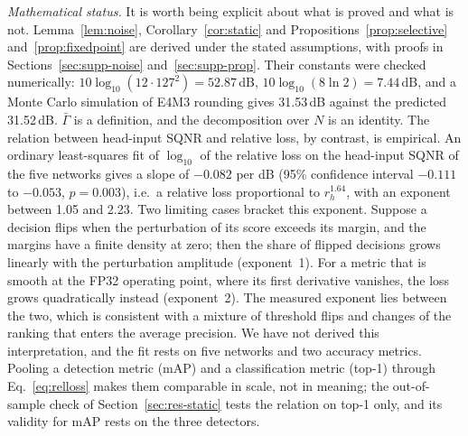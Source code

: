 \documentclass[pdflatex,sn-mathphys-num]{sn-jnl}%
\theoremstyle{thmstyleone}%
\theoremstyle{thmstyletwo}%
\theoremstyle{thmstylethree}%
\begin{document}
\emph{Mathematical status.} It is worth being explicit about what is proved and what is not. Lemma~\ref{lem:noise}, Corollary~\ref{cor:static} and Propositions~\ref{prop:selective} and~\ref{prop:fixedpoint} are derived under the stated assumptions, with proofs in Sections~\ref{sec:supp-noise} and~\ref{sec:supp-prop}. Their constants were checked numerically: $10\log_{10}(12\cdot127^2)=52.87$\,dB, $10\log_{10}(8\ln2)=7.44$\,dB, and a Monte Carlo simulation of E4M3 rounding gives 31.53\,dB against the predicted 31.52\,dB. $\bar\Gamma$ is a definition, and the decomposition over $N$ is an identity. The relation between head-input SQNR and relative loss, by contrast, is empirical. An ordinary least-squares fit of $\log_{10}$ of the relative loss on the head-input SQNR of the five networks gives a slope of $-0.082$ per dB (95\% confidence interval $-0.111$ to $-0.053$, $p=0.003$), i.e.\ a relative loss proportional to $r_h^{1.64}$, with an exponent between 1.05 and 2.23. Two limiting cases bracket this exponent. Suppose a decision flips when the perturbation of its score exceeds its margin, and the margins have a finite density at zero; then the share of flipped decisions grows linearly with the perturbation amplitude (exponent~1). For a metric that is smooth at the FP32 operating point, where its first derivative vanishes, the loss grows quadratically instead (exponent~2). The measured exponent lies between the two, which is consistent with a mixture of threshold flips and changes of the ranking that enters the average precision. We have not derived this interpretation, and the fit rests on five networks and two accuracy metrics. Pooling a detection metric (mAP) and a classification metric (top-1) through Eq.~\eqref{eq:relloss} makes them comparable in scale, not in meaning; the out-of-sample check of Section~\ref{sec:res-static} tests the relation on top-1 only, and its validity for mAP rests on the three detectors.

\end{document}
